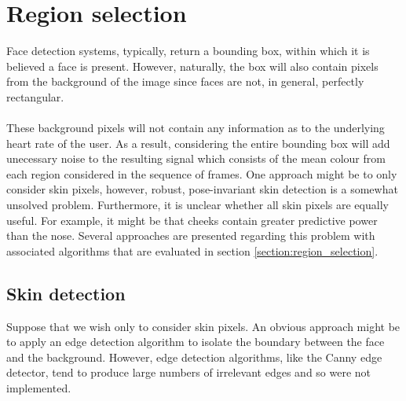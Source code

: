 \section{Region selection}
Face detection systems, typically, return a bounding box, within which it is believed
a face is present. However, naturally, the box will also contain pixels from the background of 
the image since faces are not, in general, perfectly rectangular.  \\ \\
These background pixels will not contain any information as to the underlying heart rate of the user.
As a result, considering the entire bounding box will add unecessary noise to the resulting signal which consists of the mean colour from each region considered in the sequence of frames.
One approach might be to only consider skin pixels, however, robust, pose-invariant skin detection is a somewhat unsolved problem.
Furthermore, it is unclear whether all skin pixels are equally useful. For example, it might be that cheeks contain greater predictive power than the nose. Several approaches are presented regarding this problem with associated algorithms that are evaluated in section \ref{section:region_selection}.
\subsection{Skin detection}
Suppose that we wish only to consider skin pixels. An obvious approach might be to apply an edge detection algorithm to isolate the boundary between the face and the background. However, edge detection algorithms, like the Canny edge detector, tend to produce large numbers of irrelevant edges and so were not implemented.

